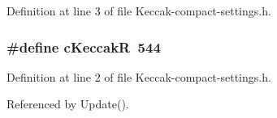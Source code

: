 Definition at line 3 of file Keccak-\/compact-\/settings.\-h.

\hypertarget{Keccak-compact-settings_8h_a5fc5899c67f1a4fdaa0a268ffae677bf}{
\subsubsection[{c\-Keccak\-R}]{\setlength{\rightskip}{0pt plus 5cm}\#define c\-Keccak\-R~544}}\label{Keccak-compact-settings_8h_a5fc5899c67f1a4fdaa0a268ffae677bf}


Definition at line 2 of file Keccak-\/compact-\/settings.\-h.



Referenced by Update().

